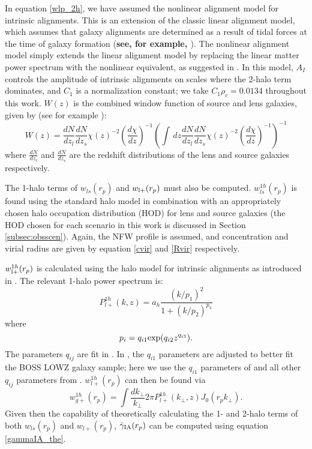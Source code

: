 \documentclass[a4paper,fleqn,usenatbib]{mnras}
\begin{document}
In equation \ref{wlp_2h}, we have assumed the nonlinear alignment model for intrinsic alignments. This is an extension of the classic linear alignment model, which assumes that galaxy alignments are determined as a result of tidal forces at the time of galaxy formation ({\bf see, for example, \cite{xxx}}). The nonlinear alignment model simply extends the linear alignment model by replacing the linear matter power spectrum with the nonlinear equivalent, as suggested in \cite{Bridle2007}. In this model, $A_I$ controls the amplitude of intrinsic alignments on scales where the 2-halo term dominates, and $C_1$ is a normalization constant; we take $C_1 \rho_c = 0.0134$ throughout this work. $W(z)$ is the combined window function of source and lens galaxies, given by (see for example \cite{Singh2014}):
\begin{equation}
W(z) = \frac{dN}{dz_l}\frac{dN}{dz_s}\chi(z)^{-2} \left( \frac{d\chi}{dz}\right)^{-1} \left(\int \, dz \frac{dN}{dz_l}\frac{dN}{dz_s}\chi(z)^{-2} \left( \frac{d\chi}{dz}\right)^{-1}\right)^{-1}
\label{window}
\end{equation}
where $\frac{dN}{dz_l}$ and $\frac{dN}{dz_s}$ are the redshift distributions of the lens and source galaxies respectively.

The 1-halo terms of $w_{ls}(r_p)$ and $w_{\rm l+}(r_p)$ must also be computed. $w_{ls}^{1h}(r_p)$ is found using the standard halo model in combination with an appropriately chosen halo occupation distribution (HOD) for lens and source galaxies (the HOD chosen for each scenario in this work is discussed in Section \ref{subsec:obsscen}). Again, the NFW profile is assumed, and concentration and virial radius are given by equation \ref{cvir} and \ref{Rvir} respectively. 

$w_{\rm l+}^{1h}(r_p)$ is calculated using the halo model for intrinsic alignments as introduced in \cite{Schneider2010}. The relevant 1-halo power spectrum is:
\begin{equation}
P^{1h}_{l+}(k,z) = a_h \frac{(k/p_1)^2}{1+ (k/p_2)^{p_3}}
\label{P1hIA}
\end{equation}
where
\begin{equation}
p_i = q_{i1} {\rm exp}(q_{i2} z^{q_{i3}}).
\label{pi}
\end{equation}
The parameters $q_{ij}$ are fit in \cite{Schneider2010}. In \cite{Singh2014}, the $q_{i1}$ parameters are adjusted to better fit the BOSS LOWZ galaxy sample; here we use the $q_{i1}$ parameters of \cite{Singh2014} and all other $q_{ij}$ parameters from \cite{Schneider2010}. $w_{l+}^{1h}(r_p)$ can then be found via
\begin{equation}
w_{g+}^{1h}(r_p) = \int \frac{dk_\perp}{k_\perp}{2\pi} P^{1h}_{l+}(k_\perp,z) J_0(r_p k_\perp).
\label{wg1h}
\end{equation}
Given then the capability of theoretically calculating the 1- and 2-halo terms of both $w_{ls}(r_p)$ and $w_{l+}(r_p)$, $\bar{\gamma}_{\rm IA}(r_p)$ can be computed using equation \ref{gammaIA_the}.
\end{document}
